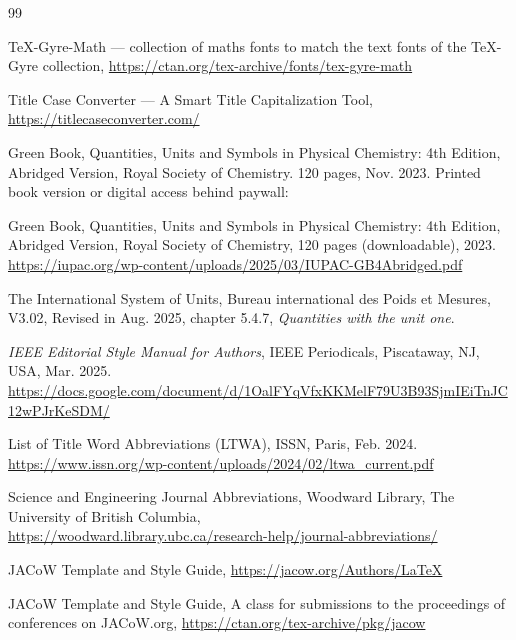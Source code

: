 \documentclass[%
               hyphens,       %
               ]{jacow}
\begin{document}
\begin{thebibliography}{99}   %
	
    	\TeX-Gyre-Math — collection of maths fonts to match the text fonts of the \TeX-Gyre collection,
    	\url{https://ctan.org/tex-archive/fonts/tex-gyre-math}

    	Title Case Converter — A Smart Title Capitalization Tool,
    	\url{https://titlecaseconverter.com/}

		Green Book, Quantities, Units and Symbols in Physical Chemistry: 4th Edition, Abridged Version,
		Royal Society of Chemistry. 120 pages, Nov. 2023. Printed book version or digital access behind paywall:

		Green Book, Quantities, Units and Symbols in Physical Chemistry: 4th Edition, Abridged Version,
		Royal Society of Chemistry, 120 pages (downloadable), 2023.
		\url{https://iupac.org/wp-content/uploads/2025/03/IUPAC-GB4Abridged.pdf}

		The International System of Units,
		Bureau international des Poids et Mesures,
		V3.02, Revised in Aug. 2025,
		chapter 5.4.7, \textit{Quantities with the unit one}.

		\textit{IEEE Editorial Style Manual for Authors},
		IEEE Periodicals, Piscataway,
		NJ, USA, Mar. 2025. 
		\url{https://docs.google.com/document/d/1OalFYqVfxKKMelF79U3B93SjmIEiTnJC12wPJrKeSDM/}
\flushcolsend

		List of Title Word Abbreviations (LTWA),
		ISSN, Paris, Feb. 2024.
		\url{https://www.issn.org/wp-content/uploads/2024/02/ltwa_current.pdf}

		Science and Engineering Journal Abbreviations, Woodward Library, The University of British Columbia,\\
		\url{https://woodward.library.ubc.ca/research-help/journal-abbreviations/}

		JACoW Template and Style Guide, 
		\url{https://jacow.org/Authors/LaTeX}
	
		JACoW Template and Style Guide, 
		A class for submissions to the proceedings of conferences on JACoW.org,
		\url{https://ctan.org/tex-archive/pkg/jacow}
	
\end{thebibliography}
\end{document}
